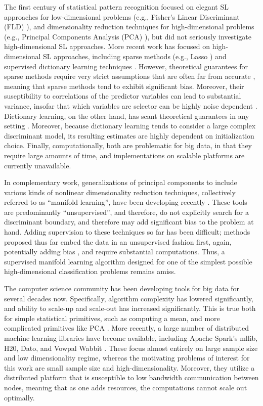 \documentclass[10pt]{article}
\begin{document}
The first century of statistical pattern recognition focused on elegant SL approaches for low-dimensional problems (e.g., Fisher's Linear Discriminant (FLD) \cite{Fisher}), and dimensionality reduction techniques for high-dimensional problems (e.g., Principal Components Analysis (PCA) \cite{PCA}), but did not seriously investigate high-dimensional SL approaches.  More recent work has focused on high-dimensional SL approaches, including sparse methods (e.g., Lasso \cite{Lasso}) and supervised dictionary learning techniques \cite{Mairal2009}.  However, theoretical guarantees for sparse methods require very strict assumptions that are often far from accurate \cite{??}, meaning that sparse methods tend to exhibit significant bias.  Moreover, their suseptibility to correlations of the predictor variables can lead to substantial variance, insofar that which variables are selector can be highly noise dependent \cite{Meinshausen2010c}.  Dictionary learning, on the other hand, has scant theoretical guarantees in any setting \cite{??}.  Moreover, because dictionary learning tends to consider a large complex discriminant model, its resulting estimates are highly dependent on initialization choice.  Finally, computationally, both are problematic for big data, in that they require large amounts of time, and implementations on scalable platforms are currently unavailable.   

In complementary work, generalizations of principal components to include various kinds of nonlinear dimensionality reduction techniques, collectively referred to as  ``manifold learning'', have been developing recently \cite{??}. These tools are predominantly ``unsupervised'', and therefore, do not explicitly search for a discriminant boundary, and therefore may add significant bias to the problem at hand.  Adding supervision to these techniques so far has been difficult; methods proposed thus far embed the data in an unsupervised fashion first, again, potentially adding bias \cite{Belkin2004a}, and require substantial computations.   Thus, a supervised manifold learning algorithm designed for one of the simplest possible high-dimensional classification problems remains amiss.


The computer science community has been developing tools for big data for several decades now. Specifically, algorithm complexity has lowered significantly, and ability to scale-up and scale-out has increased significantly.  This is true both for simple statistical primitives, such as computing a mean, and more complicated primitives like PCA \cite{??}.  More recently, a large number of distributed machine learning libraries have become available, including Apache Spark's mllib,  H20, Dato, and Vowpal Wabbit \cite{??}.  These focus almost entirely on large sample size and low dimensionality regime, whereas the motivating problems of interest for this work are small sample size and high-dimensionality. Moreover, they utilize a distributed platform that is susceptible to low bandwidth communication between nodes, meaning that as one adds resources, the computations cannot scale out optimally.
\end{document}
